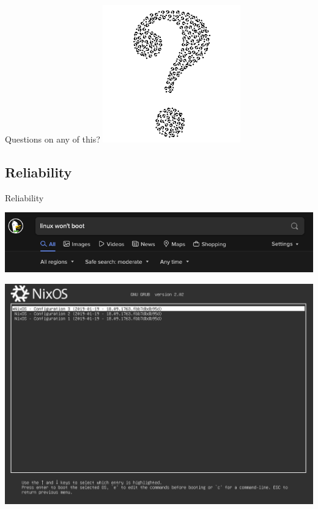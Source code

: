 \documentclass{beamer}
\begin{document}
\begin{frame}
    \centering
    Questions on any of this?
    \includegraphics{../resources/question-2.png}
\end{frame}

\subsection{Reliability}

\begin{frame}
    \centering
    Reliability
\end{frame}

\begin{frame}
    \centering
    \includegraphics[width=\textheight,keepaspectratio]{../resources/linux-wont-boot.png}
\end{frame}

\begin{frame}
    \centering
    \includegraphics[width=\textheight,keepaspectratio]{../resources/nix-grub-bios.jpg}
\end{frame}
\end{document}
